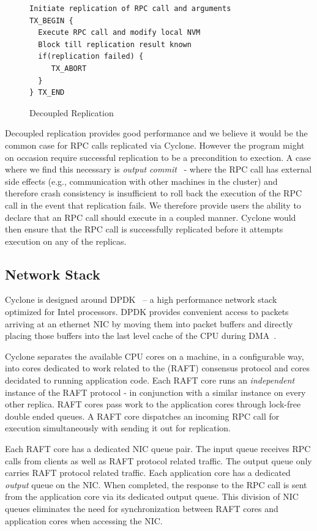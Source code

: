 \documentclass[10pt, preprint]{sigplanconf}
\begin{document}
\begin{figure}
{ \scriptsize
\begin{verbatim}
Initiate replication of RPC call and arguments 
TX_BEGIN { 
  Execute RPC call and modify local NVM 
  Block till replication result known 
  if(replication failed) {
     TX_ABORT 
  } 
} TX_END
\end{verbatim}
}
\caption{Decoupled Replication}
\label{fig:async_rep}
\end{figure}

Decoupled replication provides good performance and we believe it would be the
common case for RPC calls replicated via Cyclone. However the program might on
occasion require successful replication to be a precondition to exection. A case
where we find this necessary is \textit{output commit}~\cite{output_commit} -
where the RPC call has external side effects (e.g., communication with other
machines in the cluster) and therefore crash consistency is insufficient to roll
back the execution of the RPC call in the event that replication fails. We
therefore provide users the ability to declare that an RPC call should execute
in a coupled manner. Cyclone would then ensure that the RPC call is successfully
replicated before it attempts execution on any of the replicas.

\subsection{Network Stack}
Cyclone is designed around DPDK~\cite{dpdk} -- a high performance network stack
optimized for Intel processors. DPDK provides convenient access to packets
arriving at an ethernet NIC by moving them into packet buffers and directly
placing those buffers into the last level cache of the CPU during DMA~\cite{ddio}.

Cyclone separates the available CPU cores on a machine, in a configurable way,
into cores dedicated to work related to the (RAFT) consensus protocol and cores
decidated to running application code. Each RAFT core runs an \emph{independent}
instance of the RAFT protocol - in conjunction with a similar instance on every
other replica. RAFT cores pass work to the application cores through lock-free
double ended queues. A RAFT core dispatches an incoming RPC call for execution
simultaneously with sending it out for replication.

Each RAFT core has a dedicated NIC queue pair. The input queue receives RPC
calls from clients as well as RAFT protocol related traffic. The output queue
only carries RAFT protocol related traffic. Each application core has a
dedicated \emph{output} queue on the NIC. When completed, the response to the
RPC call is sent from the application core via its dedicated output queue. This
division of NIC queues eliminates the need for synchronization between RAFT
cores and application cores when accessing the NIC.
\end{document}
